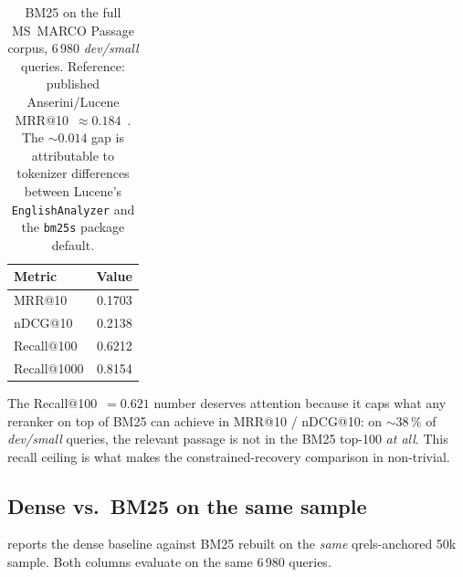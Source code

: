 \documentclass[11pt,a4paper]{article}
\makeatletter
\newcommand{\devsmall}{\textit{dev/small}}
\newcommand{\fdev}{6\,980}
\newcommand{\msmarco}{MS~MARCO}
\newcommand{\mrr}{MRR@10}
\newcommand{\ndcg}{nDCG@10}
\newcommand{\recallH}{Recall@100}
\newcommand{\recallK}{Recall@1000}
\newcommand{\bmtwofive}{BM25}
\makeatother
\begin{document}
\begin{table}[H]
  \centering
  \caption{\bmtwofive{} on the full \msmarco{} Passage corpus,
  \fdev{} \devsmall{} queries.  Reference: published Anserini/Lucene
  \mrr{}~$\approx 0.184$~\cite{lin2021pyserini}.  The $\sim\!0.014$
  gap is attributable to tokenizer differences between Lucene's
  \texttt{EnglishAnalyzer} and the \texttt{bm25s} package
  default.}
  \label{tab:w2-results}
  \begin{tabular}{lr}
    \toprule
    Metric        & Value \\
    \midrule
    \mrr{}        & 0.1703 \\
    \ndcg{}       & 0.2138 \\
    \recallH{}    & 0.6212 \\
    \recallK{}    & 0.8154 \\
    \bottomrule
  \end{tabular}
\end{table}

The \recallH{}~$=0.621$ number deserves attention because it caps
what any reranker on top of \bmtwofive{} can achieve in \mrr{} /
\ndcg{}: on $\sim\!38\,\%$ of \devsmall{} queries, the relevant
passage is not in the \bmtwofive{} top-100 \emph{at all}.  This
recall ceiling is what makes the constrained-recovery comparison in
 non-trivial.

\subsection{Dense vs.\ \bmtwofive{} on the same sample}
\label{sec:w4-results}

 reports the dense baseline against
\bmtwofive{} rebuilt on the \emph{same} qrels-anchored 50k sample.
Both columns evaluate on the same \fdev{} queries.

\begin{table}[H]
  \centering
  \caption{Dense vs.\ \bmtwofive{} on the same
  qrels-anchored 50k passage sample, \fdev{} \devsmall{} queries.
  Encoder: \texttt{sentence-transformers/all-MiniLM-L6-v2} (generic,
  not \msmarco{}-tuned).  Index: FAISS \texttt{IndexFlatIP} over
  L2-normalised embeddings.  Absolute numbers are upper-bounded by
  the qrels-anchored sampling design ();
  the meaningful comparison is the same-sample $\Delta$.}
  \label{tab:w4-results}
  
\end{table}
\end{document}
